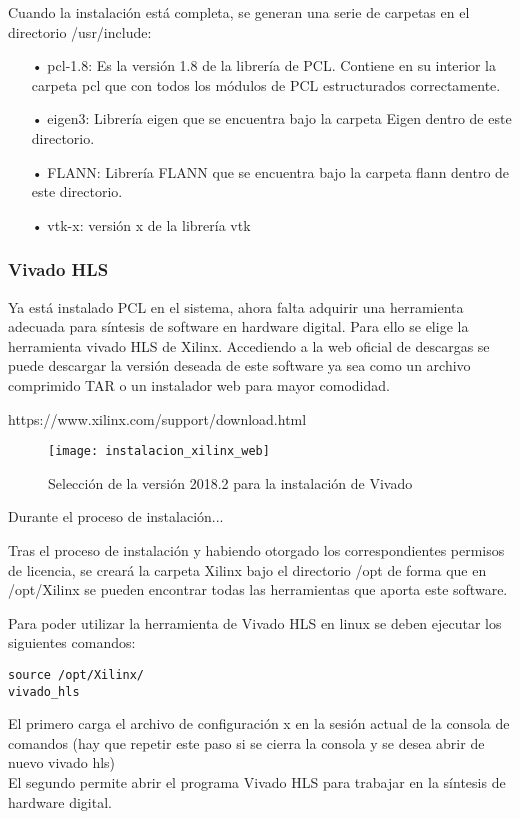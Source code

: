 Cuando la instalación está completa, se generan una serie de carpetas en el directorio /usr/include:

\begin{itemize}
\item[•]pcl-1.8: Es la versión 1.8 de la librería de PCL. Contiene en su interior la carpeta pcl que con todos los módulos de PCL estructurados correctamente.
\item[•]eigen3: Librería eigen que se encuentra bajo la carpeta Eigen dentro de este directorio.
\item[•]FLANN: Librería FLANN que se encuentra bajo la carpeta flann dentro de este directorio.
\item[•]vtk-x: versión x de la librería vtk 
\end{itemize}

\subsubsection{Vivado HLS}
Ya está instalado PCL en el sistema, ahora falta adquirir una herramienta adecuada para síntesis de software en hardware digital. Para ello se elige la herramienta vivado HLS de Xilinx. Accediendo a la web oficial de descargas se puede descargar la versión deseada de este software ya sea como un archivo comprimido TAR o un instalador web para mayor comodidad.

https://www.xilinx.com/support/download.html

\begin{figure}[!htb]
\centering
{}
  \texttt{[image: instalacion\_xilinx\_web]}
  \caption{Selección de la versión 2018.2 para la instalación de Vivado}\label{fig:instalacion_xilinx_web}
\endminipage\hfill
\end{figure}

Durante el proceso de instalación...


Tras el proceso de instalación y habiendo otorgado los correspondientes permisos de licencia, se creará la carpeta Xilinx bajo el directorio /opt de forma que en /opt/Xilinx se pueden encontrar todas las herramientas que aporta este software.

Para poder utilizar la herramienta de Vivado HLS en linux se deben ejecutar los siguientes comandos:

\begin{verbatim}
source /opt/Xilinx/
vivado_hls
\end{verbatim}
El primero carga el archivo de configuración x en la sesión actual de la consola de comandos (hay que repetir este paso si se cierra la consola y se desea abrir de nuevo vivado hls)
\\
El segundo permite abrir el programa Vivado HLS para trabajar en la síntesis de hardware digital.



